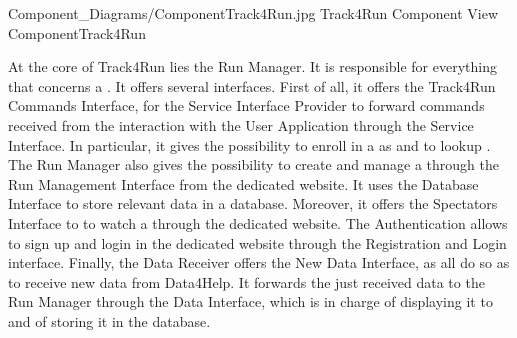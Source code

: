 \documentclass[../../DD.tex]{subfiles}
\begin{document}
	\image {13cm} {Component_Diagrams/ComponentTrack4Run.jpg} {Track4Run Component View} {ComponentTrack4Run}

	At the core of Track4Run lies the Run Manager. It is responsible for everything that concerns a . It offers several interfaces. First of all, it offers the Track4Run Commands Interface, for the Service Interface Provider to forward commands received from the interaction with the User Application through the Service Interface. In particular, it gives  the possibility to enroll in a  as  and to lookup . The Run Manager also gives  the possibility to create and manage a  through the Run Management Interface from the  dedicated website. It uses the Database Interface to store relevant data in a database. Moreover, it offers the Spectators Interface to  to watch a  through the  dedicated website.
	The Authentication allows  to sign up and login in the dedicated website through the Registration and Login interface.
	Finally, the Data Receiver offers the New Data Interface, as all  do so as to receive new data from Data4Help. It forwards the just received data to the Run Manager through the Data Interface, which is in charge of displaying it to  and of storing it in the database.
	
\end{document}
